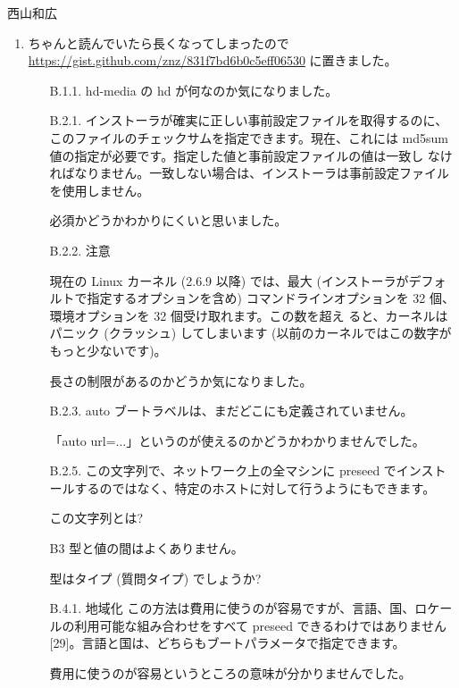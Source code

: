 \documentclass[mingoth,a4paper]{jsarticle}
\begin{document}
\begin{prework}{ 西山和広 }
  \begin{enumerate}
  \item ちゃんと読んでいたら長くなってしまったので \url{https://gist.github.com/znz/831f7bd6b0c5eff06530} に置きました。

    \begin{itemize}
    \item[B.1.1.]
      hd-media の hd が何なのか気になりました。
    \item[B.2.1.]
      インストーラが確実に正しい事前設定ファイルを取得するのに、このファイルのチェックサムを指定できます。現在、これには md5sum 値の指定が必要です。指定した値と事前設定ファイルの値は一致し
      なければなりません。一致しない場合は、インストーラは事前設定ファイルを使用しません。
   
      必須かどうかわかりにくいと思いました。
    \item[B.2.2.]
      注意

      現在の Linux カーネル (2.6.9 以降) では、最大 (インストーラがデフォルトで指定するオプションを含め) コマンドラインオプションを 32 個、環境オプションを 32 個受け取れます。この数を超え    ると、カーネルはパニック (クラッシュ) してしまいます (以前のカーネルではこの数字がもっと少ないです)。
   
      長さの制限があるのかどうか気になりました。

    \item[B.2.3.]
    auto ブートラベルは、まだどこにも定義されていません。
   
    「auto url=...」というのが使えるのかどうかわかりませんでした。

    \item[B.2.5.]
    この文字列で、ネットワーク上の全マシンに preseed でインストールするのではなく、特定のホストに対して行うようにもできます。
   
    この文字列とは?

    \item[B3]
    型と値の間はよくありません。
   
    型はタイプ (質問タイプ) でしょうか?

    \item[B.4.1. 地域化]
    この方法は費用に使うのが容易ですが、言語、国、ロケールの利用可能な組み合わせをすべて preseed できるわけではありません[29]。言語と国は、どちらもブートパラメータで指定できます。
   
    費用に使うのが容易というところの意味が分かりませんでした。


\end{itemize}
\end{enumerate}
\end{prework}
\end{document}
